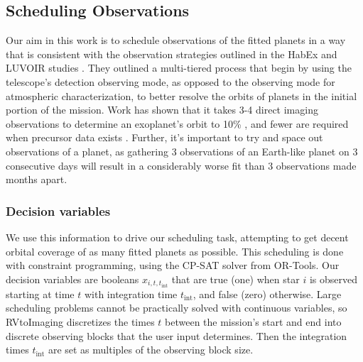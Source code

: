 \subsection{Scheduling Observations}

Our aim in this work is to schedule observations of the fitted planets in a way
that is consistent with the observation strategies outlined in the HabEx and
LUVOIR studies \cite{gaudiHabitableExoplanetObservatory2020,TheLUVOIRTeam2019}.
They outlined a multi-tiered process that begin by using the telescope's
detection observing mode, as opposed to the observing mode for atmospheric
characterization, to better resolve the orbits of planets in the initial
portion of the mission. Work has shown that it takes 3-4 direct imaging
observations to determine an exoplanet's orbit to 10\%
\citep{bluntOrbitsImpatient2017}, and fewer are required when precursor data
exists \citep{gaudiHabitableExoplanetObservatory2020}. Further, it's important
to try and space out observations of a planet, as gathering 3 observations of
an Earth-like planet on 3 consecutive days will result in a considerably worse
fit than 3 observations made months apart.

\subsubsection{Decision variables}

We use this information to drive our scheduling task, attempting to get decent
orbital coverage of as many fitted planets as possible. This scheduling is done
with constraint programming, using the CP-SAT solver from
OR-Tools\citep{perronORTools2022}. Our decision variables are booleans $x_{i,
t, t_{\textrm{int}}}$ that are true (one) when star $i$ is observed starting at
time $t$ with integration time $t_{\textrm{int}}$, and false (zero) otherwise.
Large scheduling problems cannot be practically solved with continuous
variables, so RVtoImaging discretizes the times $t$ between the mission's start
and end into discrete observing blocks that the user input determines. Then the
integration times $t_{\textrm{int}}$ are set as multiples of the observing
block size. 

